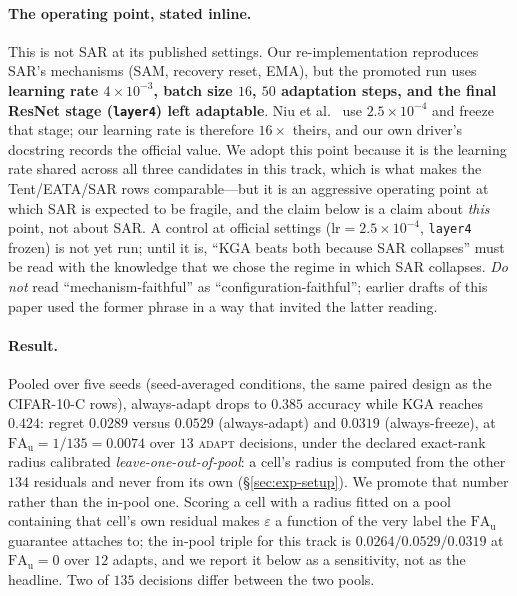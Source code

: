 \paragraph{The operating point, stated inline.} This is not SAR at its published settings. Our
re-implementation reproduces SAR's mechanisms (SAM, recovery reset, EMA), but the promoted run uses
\textbf{learning rate $4\times10^{-3}$, batch size $16$, $50$ adaptation steps, and the final
ResNet stage (\texttt{layer4}) left adaptable}. Niu et al.~\cite{niu2023sar} use
$2.5\times10^{-4}$ and freeze that stage; our learning rate is therefore $16\times$ theirs, and our
own driver's docstring records the official value. We adopt this point because it is the learning
rate shared across all three candidates in this track, which is what makes the Tent/EATA/SAR rows
comparable---but it is an aggressive operating point at which SAR is expected to be fragile, and the
claim below is a claim about \emph{this} point, not about SAR. A control at official settings
($\mathrm{lr}=2.5\times10^{-4}$, \texttt{layer4} frozen) is not yet run; until it is, ``\textsc{KGA}
beats both because SAR collapses'' must be read with the knowledge that we chose the regime in which
SAR collapses. \emph{Do not} read ``mechanism-faithful'' as ``configuration-faithful''; earlier drafts
of this paper used the former phrase in a way that invited the latter reading.

\paragraph{Result.} Pooled over five seeds (seed-averaged conditions, the same paired
design as the CIFAR-10-C rows), always-adapt drops to $0.385$ accuracy while \textsc{KGA}
reaches $0.424$: regret $\mathbf{0.0289}$ versus $0.0529$ (always-adapt) and $0.0319$
(always-freeze), at $\mathrm{FA}_{\mathrm u}=1/135=0.0074$ over $13$ \textsc{adapt} decisions,
under the declared exact-rank radius calibrated \emph{leave-one-out-of-pool}: a cell's radius is
computed from the other $134$ residuals and never from its own (\S\ref{sec:exp-setup}). We promote
that number rather than the in-pool one. Scoring a cell with a radius fitted on a pool containing
that cell's own residual makes $\varepsilon$ a function of the very label the
$\mathrm{FA}_{\mathrm u}$ guarantee attaches to; the in-pool triple for this track is
$0.0264/0.0529/0.0319$ at $\mathrm{FA}_{\mathrm u}=0$ over $12$ adapts, and we report it below as a
sensitivity, not as the headline. Two of $135$ decisions differ between the two pools.

